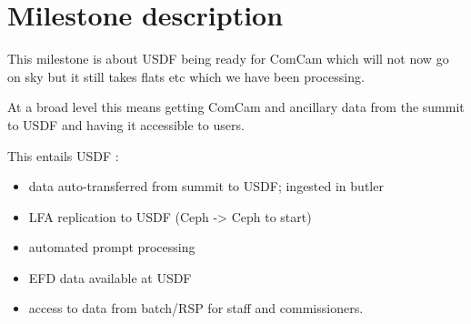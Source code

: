 \section{Milestone description} \label{sec:definition}

This milestone is about USDF being ready for ComCam which will not now go on sky but it still takes flats etc which we have been processing.

At a broad level this means getting ComCam and ancillary data from the summit to USDF and having it accessible to users.

This entails USDF :

\begin{itemize}
\item data auto-transferred from summit to USDF; ingested in butler
\item LFA replication to USDF (Ceph -> Ceph to start)
\item automated prompt processing
\item EFD data available at USDF
\item access to data from batch/RSP for staff and commissioners.
\end{itemize}
